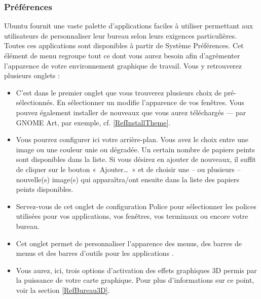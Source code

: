 \subsubsection{Préférences}
Ubuntu fournit une vaste palette d'applications faciles à utiliser permettant aux utilisateurs de personnaliser leur bureau selon leurs exigences particulières. Toutes ces applications sont disponibles à partir de Système \FlecheDroite Préférences. 
Cet élément de menu regroupe tout ce dont vous aurez besoin afin d'agrémenter l'apparence de votre environnement graphique de travail. Vous y retrouverez plusieurs onglets :
\begin{itemize}
\item C'est dans le premier onglet que vous trouverez plusieurs choix de  pré-sélectionnés. En sélectionner un modifie l'apparence de vos fenêtres. Vous pouvez également installer de nouveaux  que vous aurez téléchargés --- par GNOME Art, par exemple, cf. \ref{RefInstallTheme}.
\item Vous pourrez configurer ici votre arrière-plan. Vous avez le choix entre une image ou une couleur unie ou dégradée. Un certain nombre de papiers peints sont disponibles dans la liste. Si vous désirez en ajouter de nouveaux, il suffit de cliquer sur le bouton «~Ajouter\ldots{}~» et de choisir une -- ou plusieurs -- nouvelle(s) image(s) qui apparaîtra/ont ensuite dans la liste des papiers peints disponibles.
\item Servez-vous de cet onglet de configuration Police pour sélectionner les polices utilisées pour vos applications, vos fenêtres, vos terminaux ou encore votre bureau. 
\item Cet onglet permet de personnaliser l'apparence des menus, des barres de menus et des barres d'outils pour les applications . 
\item Vous aurez, ici, trois options d'activation des effets graphiques 3D permis par la puissance de votre carte graphique. Pour plus d'informations sur ce point, voir la section \ref{RefBureau3D}.
\end{itemize}
